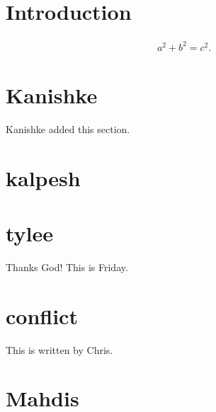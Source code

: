\documentclass{article}
\begin{document}
\section{Introduction}

\begin{align}
    a^2 + b^2 = c^2 .
\end{align}
 
\section{Kanishke}
Kanishke added this section.

\section{kalpesh}



\section{tylee}

Thanks God! This is Friday.

\section{conflict}

This is written by Chris.

\section{Mahdis}
\end{document}
